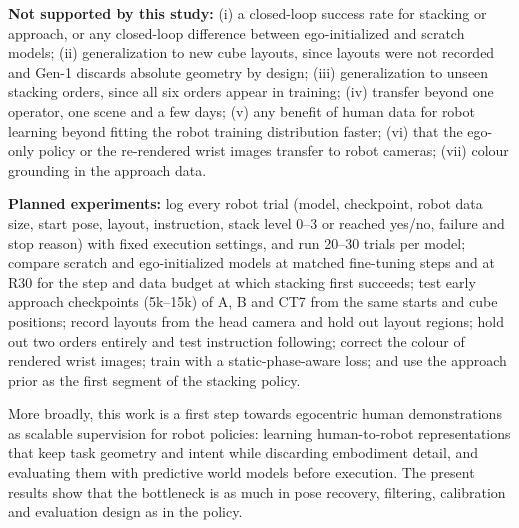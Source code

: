 \documentclass[conference,10pt]{IEEEtran}
\begin{document}
\textbf{Not supported by this study:} (i) a closed-loop success rate for stacking or approach, or any closed-loop difference between
ego-initialized and scratch models; (ii) generalization to new cube layouts, since layouts were not recorded and Gen-1 discards
absolute geometry by design; (iii) generalization to unseen stacking orders, since all six orders appear in training; (iv) transfer
beyond one operator, one scene and a few days; (v) any benefit of human data for robot learning beyond fitting the robot training
distribution faster; (vi) that the ego-only policy or the re-rendered wrist images transfer to robot cameras; (vii) colour grounding
in the approach data.

\textbf{Planned experiments:} log every robot trial (model, checkpoint, robot data size, start pose, layout, instruction, stack level
0--3 or reached yes/no, failure and stop reason) with fixed execution settings, and run 20--30 trials per model; compare scratch and
ego-initialized models at matched fine-tuning steps and at R30 for the step and data budget at which stacking first succeeds; test
early approach checkpoints (5k--15k) of A, B and CT7 from the same starts and cube positions; record layouts from the head camera and
hold out layout regions; hold out two orders entirely and test instruction following; correct the colour of rendered wrist images;
train with a static-phase-aware loss; and use the approach prior as the first segment of the stacking policy.

More broadly, this work is a first step towards egocentric human demonstrations as scalable supervision for robot policies: learning
human-to-robot representations that keep task geometry and intent while discarding embodiment detail, and evaluating them with
predictive world models before execution. The present results show that the bottleneck is as much in pose recovery, filtering,
calibration and evaluation design as in the policy.
\end{document}
